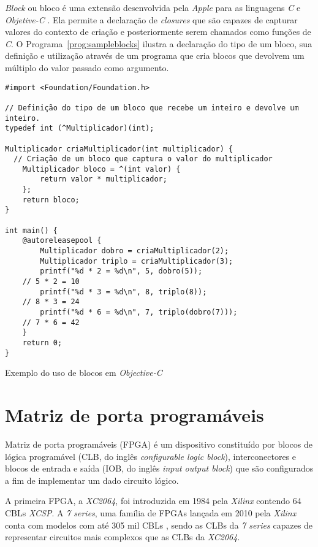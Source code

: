 \emph{Block} ou bloco é uma extensão desenvolvida pela \emph{Apple} para as linguagens
\emph{C} e \emph{Objetive-C} \citep{Blocos}. Ela permite a declaração de \emph{closures} que
são capazes de capturar valores do contexto de criação e posteriormente serem chamados como funções
de \emph{C}. O Programa~\ref{prog:sampleblocks} ilustra a declaração do tipo de um bloco, sua definição e utilização
através de um programa que cria blocos que devolvem um múltiplo do valor passado como argumento.

\begin{program}
  \centering

\lstset{language=[Objective]C}
\begin{lstlisting}[style=wider]
#import <Foundation/Foundation.h>

// Definição do tipo de um bloco que recebe um inteiro e devolve um inteiro.
typedef int (^Multiplicador)(int);

Multiplicador criaMultiplicador(int multiplicador) {
  // Criação de um bloco que captura o valor do multiplicador
	Multiplicador bloco = ^(int valor) {
		return valor * multiplicador;
	};
	return bloco;
}

int main() {
	@autoreleasepool {
		Multiplicador dobro = criaMultiplicador(2);
		Multiplicador triplo = criaMultiplicador(3);
		printf("%d * 2 = %d\n", 5, dobro(5));
    // 5 * 2 = 10
		printf("%d * 3 = %d\n", 8, triplo(8));
    // 8 * 3 = 24
		printf("%d * 6 = %d\n", 7, triplo(dobro(7)));
    // 7 * 6 = 42
	}
	return 0;
}
\end{lstlisting}

  \caption{Exemplo do uso de blocos em \emph{Objective-C}\label{prog:sampleblocks}}
\end{program}

\newpage
\section{Matriz de porta programáveis}
\label{sec:FPGA}

Matriz de porta programáveis (FPGA) é um 
dispositivo constituído por blocos de lógica programável (CLB, do inglês 
\emph{configurable logic block}), interconectores e blocos de entrada e saída 
(IOB, do inglês \emph{input output block}) que são configurados a fim de implementar um dado
circuito lógico.

A primeira FPGA, a \emph{XC2064}, foi introduzida em 1984 pela \emph{Xilinx} \citep{8392473}
contendo 64 CBLs \emph{XCSP}. A \emph{7 series}, uma família de FPGAs lançada em 2010 pela \emph{Xilinx} 
\citep{S7LN} conta com modelos com até 305 mil CBLs \citep{7CLB}, sendo as CLBs da \emph{7 series}
capazes de representar circuitos mais complexos que as CLBs da \emph{XC2064}.

